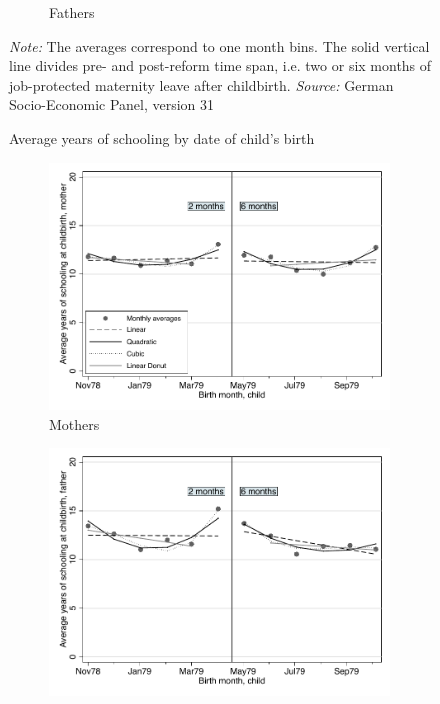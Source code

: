 \documentclass[a4paper ]{article}
\begin{document}
\begin{figure}[h]
\begin{subfigure}[t]{0.48\textwidth}
		\caption{Fathers}
	\end{subfigure}
	\caption{Average years of schooling by date of child's birth}\label{fig:yrschooling_parents_all cohorts}
	\begin{minipage}{\textwidth} %
{\footnotesize \textit{Note:} The averages correspond to one month bins. The solid vertical line divides pre- and post-reform time span, i.e. two or six months of job-protected maternity leave after childbirth. \newline \textit{Source: }German Socio-Economic Panel, version 31\par}
\end{minipage}
\end{figure}

\begin{figure}[h]
	\centering
	\begin{subfigure}[t]{0.48\textwidth}
		\centering
		\includegraphics[width=0.99\textwidth]{../../analysis/graphs/SOEP/Meduc2}
		\caption{Mothers}		
	\end{subfigure}
	\quad
	\begin{subfigure}[t]{0.48\textwidth}
		\centering
		\includegraphics[width=0.99\textwidth]{../../analysis/graphs/SOEP/Feduc2}

\end{subfigure}
\end{figure}
\end{document}
